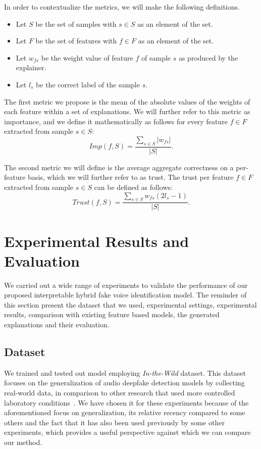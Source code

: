 \documentclass{article}
\begin{document}
In order to contextualize the metrics, we will make the following definitions.
    \begin{itemize}
        \item Let \(S\) be the set of samples with \(s \in S\) as an element of the set.
        \item Let \(F\) be the set of features with \(f \in F\) as an element of the set.
        \item Let \(w_{fs}\) be the weight value of feature \(f\) of sample \(s\) as
            produced by the explainer.
        \item Let \(l_{s}\) be the correct label of the sample \(s\).
    \end{itemize}
The first metric we propose is the mean of the absolute values of the weights of each feature within a set of explanations.
We will further refer to this metric as importance, and we define it mathematically as follows for every feature \(f \in F\) extracted from sample \(s \in S\):
\begin{equation}
    Imp(f, S) = \frac{\sum_{s \in S} |w_{fs}|}{|S|}.
\end{equation}
			
The second metric we will define is the average aggregate correctness on a per-feature basis, which we will further refer to as trust. The trust per feature \(f \in F\) extracted from sample \(s \in S \) can be defined as follows:
\begin{equation}
    Trust(f, S) = \frac{\sum_{s \in S} w_{fs}(2l_{s}-1)}{|S|}.
\end{equation}
			
            
\section{Experimental Results and Evaluation} \label{sec:experimental_results}
We carried out a wide range of experiments to validate the performance of our proposed interpretable hybrid fake voice identification model. The reminder of this section present the dataset that we used, experimental settings, experimental results, comparison with existing feature based models, the generated explanations and their evaluation.

\subsection{Dataset}
We trained and tested out model employing \textit{In-the-Wild} dataset. This dataset focuses on the generalization of audio deepfake detection models by collecting real-world data, in comparison to other research that used more controlled laboratory conditions~\cite{muller_does_2022}. We have chosen it for these experiments because of the aforementioned focus on generalization, its relative recency compared to some others and the fact that it has also been used previously by some other experiments, which provides a useful perspective against which we can compare our method.
\end{document}
